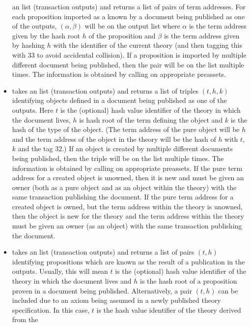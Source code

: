 \begin{itemize}
an {} list (transaction outputs)
and returns a list of pairs of term addresses.
For each proposition imported as a known by a document being published as one of the outputs,
$(\alpha,\beta)$ will be on the output list
where $\alpha$ is the term address given by the hash root $h$
of the proposition
and $\beta$ is the term address given by hashing $h$ with the identifier of the current theory
(and then tagging this with $33$ to avoid accidental collision).
If a proposition is imported by multiple
different document being published, then the pair will be on the list multiple times.
The information is obtained by calling {} on appropriate preassets.
\item {} takes
an {} list (transaction outputs)
and returns a list of triples $(t,h,k)$
identifying objects defined in a document being published as one of the outputs.
Here $t$ is the (optional) hash value identifier of the theory in which the document lives,
$h$ is hash root of the term defining the object
and $k$ is the hash of the type of the object.
(The term address of the pure object will be $h$
and the term address of the object in the theory will be the hash of
$h$ with $t$, $k$ and the tag $32$.)
If an object is created by multiple
different documents being published, then the triple will be on the list multiple times.
The information is obtained by calling {} on appropriate preassets.
If the pure term address for a created object is unowned,
then it is new and must be given an owner (both as a pure object
and as an object within the theory) with the same transaction
publishing the document.
If the pure term address for a created object is owned,
but the term address within the theory is unowned, then
the object is new for the theory and the term address within the theory
must be given an owner (as an object) with the same transaction
publishing the document.
\item {} takes
an {} list (transaction outputs)
and returns a list of pairs $(t,h)$
identifying propositions which are known as the result of a publication in the outputs.
Usually, this will mean $t$ is the (optional) hash value identifier of the theory in which the document lives
and $h$ is the hash root of a proposition proven in a document being published.
Alternatively, a pair $(t,h)$ can be included due to an axiom being assumed in a newly published theory
specification. In this case, $t$ is the hash value identifier of the theory derived from the

\end{itemize}
